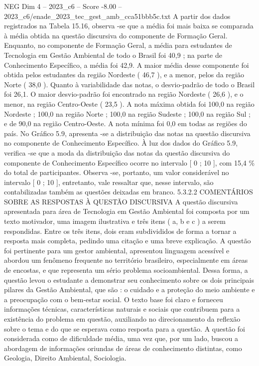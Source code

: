 \begin{textsample}{NEG Dim 4 – 2023\_c6 – Score -8.00 – 2023\_c6/enade\_2023\_tec\_gest\_amb\_cca51bbb5c.txt}
A partir dos dados registrados na Tabela 15.16, observa -se que a média foi mais baixa se comparada à média obtida na questão discursiva do componente de Formação Geral.
Enquanto, no componente de Formação Geral, a média para estudantes de Tecnologia em Gestão Ambiental de todo o Brasil foi 40,9 ; na parte de Conhecimento Específico, a média foi 42,9.
A maior média desse componente foi obtida pelos estudantes da região Nordeste ( 46,7 ), e a menor, pelos da região Norte ( 38,0 ).
Quanto à variabilidade das notas, o desvio-padrão de todo o Brasil foi 26,1.
O maior desvio-padrão foi encontrado na região Nordeste ( 26,6 ), e o menor, na região Centro-Oeste ( 23,5 ).
A nota máxima obtida foi 100,0 na região Nordeste ; 100,0 na região Norte ; 100,0 na região Sudeste ; 100,0 na região Sul ; e de 90,0 na região Centro-Oeste.
A nota mínima foi 0,0 em todas as regiões do país.
No Gráfico 5.9, apresenta -se a distribuição das notas na questão discursiva no componente de Conhecimento Específico.
À luz dos dados do Gráfico 5.9, verifica -se que a moda da distribuição das notas da questão discursiva do componente de Conhecimento Específico ocorre no intervalo [ 0 ; 10 ], com 15,4 \% do total de participantes.
Observa -se, portanto, um valor considerável no intervalo [ 0 ; 10 ], entretanto, vale ressaltar que, nesse intervalo, são contabilizadas também as questões deixadas em branco. 5.3.2.2 COMENTÁRIOS SOBRE AS RESPOSTAS À QUESTÃO DISCURSIVA A questão discursiva apresentada para área de Tecnologia em Gestão Ambiental foi composta por um texto motivador, uma imagem ilustrativa e três itens ( a, b e c ) a serem respondidas.
Entre os três itens, dois eram subdivididos de forma a tornar a resposta mais completa, pedindo uma citação e uma breve explicação.
A questão foi pertinente para um gestor ambiental, apresentou linguagem acessível e abordou um fenômeno frequente no território brasileiro, especialmente em áreas de encostas, e que representa um sério problema socioambiental.
Dessa forma, a questão levou o estudante a demonstrar seu conhecimento sobre os dois principais pilares da Gestão Ambiental, que são : o cuidado e a proteção do meio ambiente e a preocupação com o bem-estar social.
O texto base foi claro e forneceu informações técnicas, características naturais e sociais que contribuem para a existência do problema em questão, auxiliando no direcionamento da reflexão sobre o tema e do que se esperava como resposta para a questão.
A questão foi considerada como de dificuldade média, uma vez que, por um lado, buscou a abordagem de informações oriundas de áreas de conhecimento distintas, como Geologia, Direito Ambiental, Sociologia.

\end{textsample}
